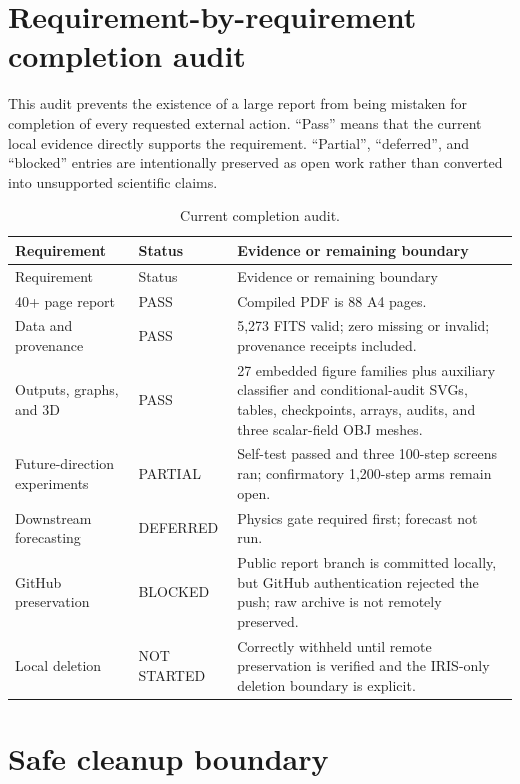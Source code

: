 \documentclass[11pt,oneside]{report}
\begin{document}
\section{Requirement-by-requirement completion audit}

This audit prevents the existence of a large report from being mistaken for completion of every requested external action. ``Pass'' means that the current local evidence directly supports the requirement. ``Partial'', ``deferred'', and ``blocked'' entries are intentionally preserved as open work rather than converted into unsupported scientific claims.

\begin{longtable}{p{}p{}p{}}
\caption{Current completion audit.}\label{tab:completion-audit}\\
\toprule
Requirement & Status & Evidence or remaining boundary \\
\midrule
\endfirsthead
\toprule
Requirement & Status & Evidence or remaining boundary \\
\midrule
\endhead
40+ page report & PASS & Compiled PDF is 88 A4 pages. \\
Data and provenance & PASS & 5,273 FITS valid; zero missing or invalid; provenance receipts included. \\
Outputs, graphs, and 3D & PASS & 27 embedded figure families plus auxiliary classifier and conditional-audit SVGs, tables, checkpoints, arrays, audits, and three scalar-field OBJ meshes. \\
Future-direction experiments & PARTIAL & Self-test passed and three 100-step screens ran; confirmatory 1,200-step arms remain open. \\
Downstream forecasting & DEFERRED & Physics gate required first; forecast not run. \\
GitHub preservation & BLOCKED & Public report branch is committed locally, but GitHub authentication rejected the push; raw archive is not remotely preserved. \\
Local deletion & NOT STARTED & Correctly withheld until remote preservation is verified and the IRIS-only deletion boundary is explicit. \\
\bottomrule
\end{longtable}

\section{Safe cleanup boundary}
\end{document}
